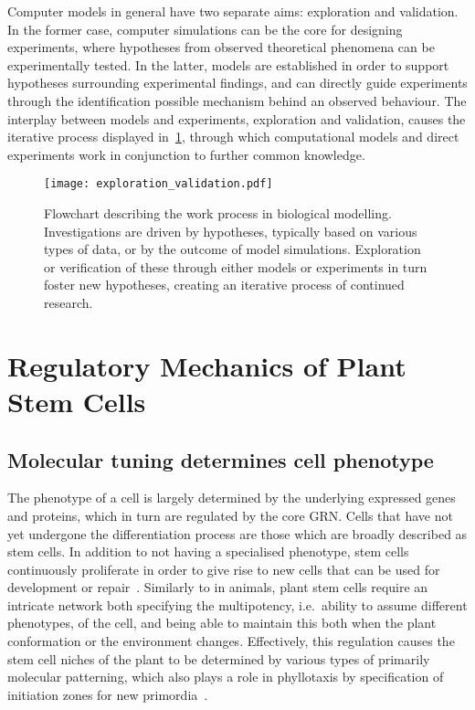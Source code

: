 Computer models in general have two separate aims: exploration and validation.
In the former case, computer simulations can be the core for designing
experiments, where hypotheses from observed theoretical phenomena
can be experimentally tested. In the latter, models are established in order to
support hypotheses surrounding experimental findings, and can directly guide
experiments through the identification possible mechanism behind an observed
behaviour. The interplay between models and experiments, exploration and
validation, causes the iterative process displayed in~\cref{fig:expl_val},
through which computational models and direct experiments work in conjunction to further
common knowledge.
\begin{figure}[H]
  \centering
  \texttt{[image: exploration\_validation.pdf]}
  \caption[Modelling biological systems: an illustration]{Flowchart describing
    the work process in biological modelling. Investigations are driven by
    hypotheses, typically based on various types of data, or by the outcome of
    model simulations. Exploration or verification of these through either
    models or experiments in turn foster new hypotheses, creating an iterative
    process of continued research.}  
  \label{fig:expl_val}
\end{figure}

\section{Regulatory Mechanics of Plant Stem Cells} %
\subsection{Molecular tuning determines cell phenotype} %
The phenotype of a cell is largely determined by the underlying
expressed genes and proteins, which in turn are regulated by the core GRN. Cells
that have not yet undergone the differentiation process are those which are
broadly described as stem cells. In addition to not having a specialised phenotype,
stem cells continuously proliferate in order to give rise to new cells that can
be used for development or repair~\cite{clark2001cell}.
Similarly to in animals, plant stem cells require an intricate network both
specifying the multipotency, i.e.\ ability to assume different phenotypes, of
the cell, and being able to maintain this both when the plant  
conformation or the environment changes. Effectively, this regulation causes the
stem cell niches of the plant to be determined by various types of primarily
molecular patterning, which also plays a role in phyllotaxis by specification of
initiation zones for new primordia~\cite{reinhardt2003regulation}.

